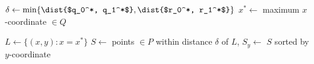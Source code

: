 \documentclass{beamer}
\begin{document}
\begin{frame}
\begin{center}
{\begin{algorithm}[H]
{                    \BlankLine \BlankLine 
                    $\delta \gets \min\{\dist{$q_0^*, q_1^*$}, \dist{$r_0^*, r_1^*$}\}$ \; 
                    $x^* \gets$ maximum $x$-coordinate $\in Q$\; 

                    \BlankLine \BlankLine 
                    $L \gets \{(x, y): x = x^*\}$ \; 
                    $S \gets$ points $\in P$ within distance $\delta$ of $L$, $S_y \gets$ $S$ sorted by $y$-coordinate\; 

                    \BlankLine \BlankLine 
                    \BlankLine \BlankLine
                }
            \end{algorithm}\DecMargin{2em} 
        }
    \end{center}
\end{frame}




\end{document}
